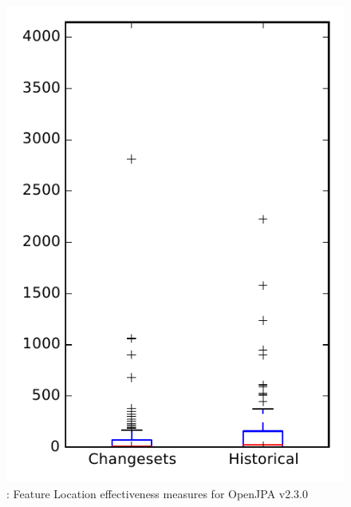 
\begin{figure}
\centering
\includegraphics[height=0.4\textheight]{figures/flt/rq2_openjpa}
\caption{\ftwo: Feature Location effectiveness measures for OpenJPA v2.3.0}
\label{fig:flt:rq2:openjpa}
\end{figure}
